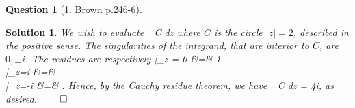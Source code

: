 \documentclass{article} %
\def\eQb#1\eQe{\begin{eqnarray*}#1\end{eqnarray*}}
\theoremstyle{quest}
\newtheorem*{question}{Question}
\newtheorem*{solution}{Solution}
\begin{document}
\bigskip

\begin{question}[1. Brown p.246-6]
\end{question}
\begin{solution}
We wish to evaluate 
\eQb
\int_{C}  dz
\eQe
where $C$ is the circle $|z| = 2$, described in the positive sense. 
The singularities of the integrand, that are interior to $C$,
are $0, \pm i$. The residues are respectively
\eQb
\dfrac{\cosh(\pi z)}{z^2 +1}|_{z = 0} &=& 1 \\
|_{z=i} &=&  \\
|_{z=-i} &=& .
\eQe 
Hence, by the Cauchy residue theorem, we have
\eQb
\int_{C}  dz = 4\pi i,
\eQe
as desired. $\qed$
\end{solution}
\end{document}
